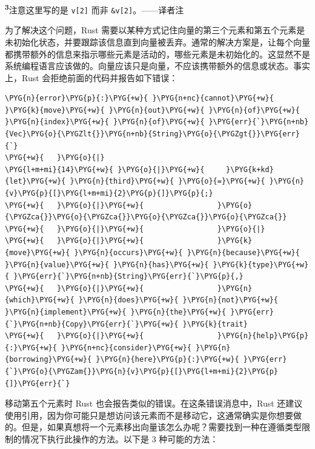 \begin{myNote}
\textsuperscript{\textbf{3}}注意这里写的是 \texttt{v[2]} 而非 \texttt{\&v[2]}。——译者注
\end{myNote}

为了解决这个问题，Rust 需要以某种方式记住向量的第三个元素和第五个元素是未初始化状态，并要跟踪该信息直到向量被丢弃。通常的解决方案是，让每个向量都携带额外的信息来指示哪些元素是活动的，哪些元素是未初始化的。这显然不是系统编程语言应该做的。向量应该只是向量，不应该携带额外的信息或状态。事实上，Rust 会拒绝前面的代码并报告如下错误：

\begin{Verbatim}[commandchars=\\\{\},breaklines=true,breakanywhere=true,fontsize=\codefont,xleftmargin=17bp]
\PYG{n}{error}\PYG{p}{:}\PYG{+w}{ }\PYG{n+nc}{cannot}\PYG{+w}{ }\PYG{k}{move}\PYG{+w}{ }\PYG{n}{out}\PYG{+w}{ }\PYG{n}{of}\PYG{+w}{ }\PYG{n}{index}\PYG{+w}{ }\PYG{n}{of}\PYG{+w}{ }\PYG{err}{`}\PYG{n+nb}{Vec}\PYG{o}{\PYGZlt{}}\PYG{n+nb}{String}\PYG{o}{\PYGZgt{}}\PYG{err}{`}
\PYG{+w}{   }\PYG{o}{|}
\PYG{l+m+mi}{14}\PYG{+w}{ }\PYG{o}{|}\PYG{+w}{     }\PYG{k+kd}{let}\PYG{+w}{ }\PYG{n}{third}\PYG{+w}{ }\PYG{o}{=}\PYG{+w}{ }\PYG{n}{v}\PYG{p}{[}\PYG{l+m+mi}{2}\PYG{p}{]}\PYG{p}{;}
\PYG{+w}{   }\PYG{o}{|}\PYG{+w}{                 }\PYG{o}{\PYGZca{}}\PYG{o}{\PYGZca{}}\PYG{o}{\PYGZca{}}\PYG{o}{\PYGZca{}}
\PYG{+w}{   }\PYG{o}{|}\PYG{+w}{                 }\PYG{o}{|}
\PYG{+w}{   }\PYG{o}{|}\PYG{+w}{                 }\PYG{k}{move}\PYG{+w}{ }\PYG{n}{occurs}\PYG{+w}{ }\PYG{n}{because}\PYG{+w}{ }\PYG{n}{value}\PYG{+w}{ }\PYG{n}{has}\PYG{+w}{ }\PYG{k}{type}\PYG{+w}{ }\PYG{err}{`}\PYG{n+nb}{String}\PYG{err}{`}\PYG{p}{,}
\PYG{+w}{   }\PYG{o}{|}\PYG{+w}{                 }\PYG{n}{which}\PYG{+w}{ }\PYG{n}{does}\PYG{+w}{ }\PYG{n}{not}\PYG{+w}{ }\PYG{n}{implement}\PYG{+w}{ }\PYG{n}{the}\PYG{+w}{ }\PYG{err}{`}\PYG{n+nb}{Copy}\PYG{err}{`}\PYG{+w}{ }\PYG{k}{trait}
\PYG{+w}{   }\PYG{o}{|}\PYG{+w}{                 }\PYG{n}{help}\PYG{p}{:}\PYG{+w}{ }\PYG{n+nc}{consider}\PYG{+w}{ }\PYG{n}{borrowing}\PYG{+w}{ }\PYG{n}{here}\PYG{p}{:}\PYG{+w}{ }\PYG{err}{`}\PYG{o}{\PYGZam{}}\PYG{n}{v}\PYG{p}{[}\PYG{l+m+mi}{2}\PYG{p}{]}\PYG{err}{`}
\end{Verbatim}

移动第五个元素时 Rust 也会报告类似的错误。在这条错误消息中，Rust 还建议使用引用，因为你可能只是想访问该元素而不是移动它，这通常确实是你想要做的。但是，如果真想将一个元素移出向量该怎么办呢？需要找到一种在遵循类型限制的情况下执行此操作的方法。以下是 3 种可能的方法：

